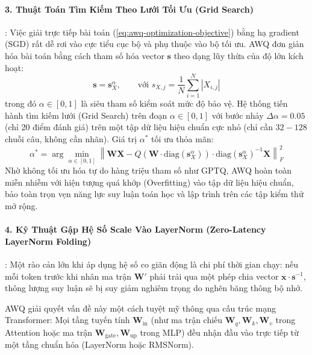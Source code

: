 \paragraph{3. Thuật Toán Tìm Kiếm Theo Lưới Tối Ưu (Grid Search)}:
Việc giải trực tiếp bài toán (\ref{eq:awq-optimization-objective}) bằng hạ gradient (SGD) rất dễ rơi vào cực tiểu cục bộ và phụ thuộc vào bộ tối ưu. AWQ đơn giản hóa bài toán bằng cách tham số hóa vector $\mathbf{s}$ theo dạng lũy thừa của độ lớn kích hoạt:
\begin{equation}
\mathbf{s} = \mathbf{s}_X^\alpha, \qquad \text{với } s_{X, j} = \frac{1}{N} \sum_{i=1}^N |X_{i, j}|
\end{equation}
trong đó $\alpha \in [0, 1]$ là siêu tham số kiểm soát mức độ bảo vệ.
Hệ thống tiến hành tìm kiếm lưới (Grid Search) trên đoạn $\alpha \in [0, 1]$ với bước nhảy $\Delta \alpha = 0.05$ (chỉ 20 điểm đánh giá) trên một tập dữ liệu hiệu chuẩn cực nhỏ (chỉ cần $32 - 128$ chuỗi câu, không cần nhãn). Giá trị $\alpha^*$ tối ưu thỏa mãn:
\begin{equation}
\alpha^* = \arg\min_{\alpha \in [0, 1]} \left\| \mathbf{W} \mathbf{X} - Q\left(\mathbf{W} \cdot \text{diag}(\mathbf{s}_X^\alpha)\right) \cdot \text{diag}(\mathbf{s}_X^\alpha)^{-1} \mathbf{X} \right\|_F^2
\end{equation}
Nhờ không tối ưu hóa tự do hàng triệu tham số như GPTQ, AWQ hoàn toàn miễn nhiễm với hiện tượng quá khớp (Overfitting) vào tập dữ liệu hiệu chuẩn, bảo toàn trọn vẹn năng lực suy luận toán học và lập trình trên các tập kiểm thử mở rộng.

\paragraph{4. Kỹ Thuật Gập Hệ Số Scale Vào LayerNorm (Zero-Latency LayerNorm Folding)}:
Một rào cản lớn khi áp dụng hệ số co giãn động là chi phí thời gian chạy: nếu mỗi token trước khi nhân ma trận $\mathbf{W}'$ phải trải qua một phép chia vector $\mathbf{x} \cdot \mathbf{s}^{-1}$, thông lượng suy luận sẽ bị suy giảm nghiêm trọng do nghẽn băng thông bộ nhớ.

AWQ giải quyết vấn đề này một cách tuyệt mỹ thông qua cấu trúc mạng Transformer: Mọi tầng tuyến tính $\mathbf{W}_{\text{in}}$ (như ma trận chiếu $\mathbf{W}_q, \mathbf{W}_k, \mathbf{W}_v$ trong Attention hoặc ma trận $\mathbf{W}_{\text{gate}}, \mathbf{W}_{\text{up}}$ trong MLP) đều nhận đầu vào trực tiếp từ một tầng chuẩn hóa (LayerNorm hoặc RMSNorm).

